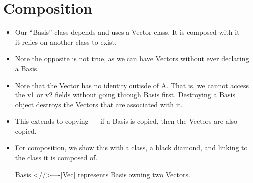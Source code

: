 \documentclass{article}
\begin{document}
\section{Composition}
\begin{itemize}
\item Our ``Basis'' class depends and uses a Vector class.  It is composed with it --- it relies on another class to exist.
\item Note the opposite is not true, as we can have Vectors without ever declaring a Basis.
\item Note that the Vector has no identity outisde of A.  That is, we cannot access the v1 or v2 fields without going through Basis first. Destroying a Basis object destroys the Vectors that are associated with it.
\item This extends to copying --- if a Basis is copied, then the Vectors are also copied.
\item For composition, we show this with a class, a black diamond, and linking to the class it is composed of.
\item [Basis]<//>----[Vec] represents Basis owning two Vectors.
\end{itemize}
\end{document}
